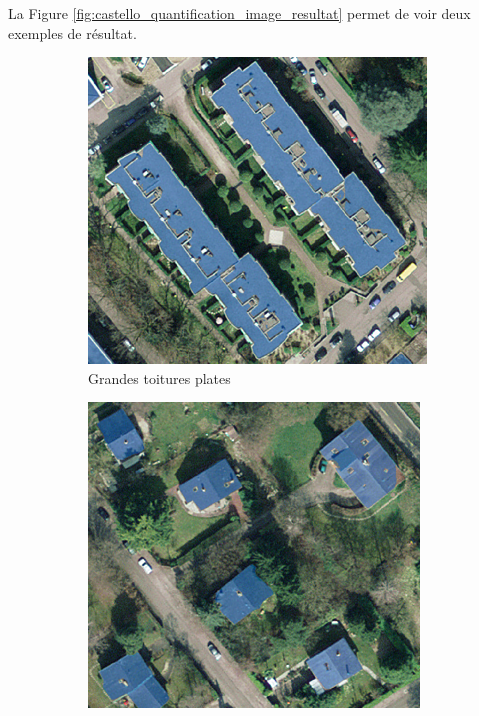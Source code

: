 \par{La Figure \ref{fig:castello_quantification_image_resultat} permet de voir deux exemples de résultat.}
\begin{figure}[H]
    \centering
    \begin{subfigure}{0.44\textwidth}
        \centering
        \includegraphics[width=\textwidth]{02-main//figures/ch2/castello_quantification_image_resultat1.png}
        \caption{Grandes toitures plates}
        \label{fig:castello_quantification_image_resultat1}
    \end{subfigure}
    \hfill
    \begin{subfigure}{0.43\textwidth}
        \centering
        \includegraphics[width=\textwidth]{02-main//figures/ch2/castello_quantification_image_resultat2.png}

\end{subfigure}
\end{figure}
